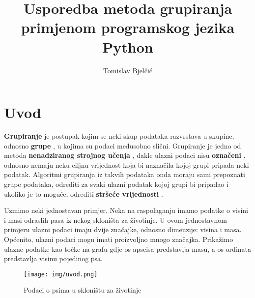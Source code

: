 \documentclass[times, utf8, zavrsni]{fer}
\begin{document}

\title{Usporedba metoda grupiranja primjenom programskog jezika Python}

\author{Tomislav Bjelčić}

\maketitle

\izvornik

\zahvala{}

\tableofcontents

\chapter{Uvod}

\textbf{Grupiranje}  je postupak kojim se neki skup podataka razvrstava u skupine, odnosno \textbf{grupe} , u kojima su podaci međusobno slični. Grupiranje je jedno od metoda \textbf{nenadziranog strojnog učenja} , dakle ulazni podaci nisu \textbf{označeni} , odnosno nemaju neku ciljnu vrijednost koja bi naznačila kojoj grupi pripada neki podatak. Algoritmi grupiranja iz takvih podataka onda moraju sami prepoznati grupe podataka, odrediti za svaki ulazni podatak kojoj grupi bi pripadao i ukoliko je to moguće, odrediti \textbf{stršeće vrijednosti} .

Uzmimo neki jednostavan primjer. Neka na raspolaganju imamo podatke o visini i masi odraslih pasa iz nekog 
skloništa za životinje. U ovom jednostavnom primjeru ulazni podaci imaju dvije značajke, odnosno dimenzije: visina i masa. Općenito, ulazni podaci mogu imati proizvoljno mnogo značajka. Prikažimo ulazne podatke kao 
točke na grafu gdje os apscisa predstavlja masu, a os ordinata predstavlja visinu pojedinog psa.

\begin{figure}[H]
    \centering
    \texttt{[image: img/uvod.png]}
    \caption{Podaci o psima u skloništu za životinje}
\end{figure}
\end{document}
